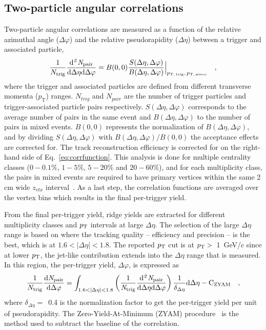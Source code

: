 \subsection{Two-particle angular correlations}
Two-particle angular correlations are measured as a function of the relative azimuthal angle ($\Delta\varphi$) and the relative pseudorapidity ($\Delta\eta$) between a trigger and associated particle,
\begin{eqnarray}
\frac{1}{N_{\rm{trig}}} \frac{ \rm{d}\it{}^{2} N_{\rm{pair}} }{ \rm{d} \Delta\eta \rm{d}\Delta\varphi} = B(0, 0)\frac{S(\Delta\eta, \Delta\varphi)}{B(\Delta\eta, \Delta\varphi)}  \Big\lvert_{p_\mathrm{T,\,trig},\,p_\mathrm{T,\,assoc}}\quad , 
\label{eq:corrfunction}
\end{eqnarray}
where the trigger and associated particles are defined from different transverse momenta ($p_\mathrm{T}$) ranges. $N_{trig}$ and $N_{pair}$ are the number of trigger particles and trigger-associated particle pairs respectively. $S(\Delta\eta, \Delta\varphi)$ corresponds to the average number of pairs in the same event and $B(\Delta\eta, \Delta\varphi)$ to the number of pairs in mixed events. $B (0,0)$ represents the normalization of $B(\Delta\eta, \Delta\varphi)$, and by dividing $S(\Delta\eta, \Delta\varphi)$ with $B(\Delta\eta, \Delta\varphi)/B (0,0)$ the acceptance effects are corrected for. The track reconstruction efficiency is corrected for on the right-hand side of Eq.~\ref{eq:corrfunction}. This analysis is done for multiple centrality classes ($0-0.1\%$, $1-5\%$, $5-20\%$ and $20-60\%$), and for each multiplicity class, the pairs in mixed events are required to have primary vertices within the same 2 cm wide $z_{vtx}$ interval~\cite{KOPYLOV1974472:evtmixing,Adam:2016tsv}. As a last step, the correlation functions are averaged over the vertex bins which results in the final per-trigger yield.


From the final per-trigger yield, ridge yields are extracted for different multiplicity classes and $p_\mathrm{T}$ intervals at large $\Delta\eta$. The selection of the large $\Delta\eta$ range is based on where the tracking quality -- efficiency and precision -- is the best, which is at $1.6<|\Delta\eta|<1.8$. The reported $p_\mathrm{T}$ cut is at $p_\mathrm{T}>$~1~GeV/$c$ since at lower $p_\mathrm{T}$, the jet-like contribution extends into the $\Delta\eta$ range that is measured. In this region, the per-trigger yield, $\Delta\varphi$, is expressed as
\begin{eqnarray}
\frac{1}{N_{\rm{trig}}} \frac{ \rm{d}\it{}N_{\rm{pair}} }{ \rm{d}\Delta\varphi } = \int_{1.6<|\Delta \eta|<1.8} \left( \frac{1}{\it{N}_{\rm{trig}}} \frac{ \rm{d}\it{}^{2} N_{\rm{pair}} }{ \rm{d}\Delta\eta d\Delta\varphi} \right) \dfrac{1}{\delta_{\Delta\eta}} \rm{d}\Delta \eta - C_{\rm{ZYAM}}\quad ,
\end{eqnarray}
where $\delta_{\Delta\eta}=$~0.4 is the normalization factor to get the per-trigger yield per unit of pseudorapidity. The Zero-Yield-At-Minimum (ZYAM) procedure~\cite{Ajitanand:2005jj} is the method used to subtract the baseline of the correlation. 


